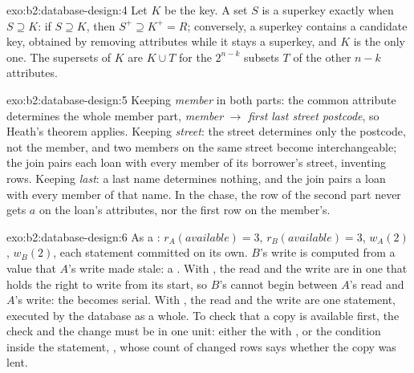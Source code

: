 \begin{solution}{exo:b2:database-design:4}
Let $K$ be the key. A set $S$ is a superkey exactly when $S \supseteq K$: if $S \supseteq K$, then $S^+ \supseteq K^+ = R$;
conversely, a superkey contains a candidate key, obtained by removing attributes while it stays a superkey, and $K$ is the
only one. The supersets of $K$ are $K \cup T$ for the $2^{n-k}$ subsets $T$ of the other $n - k$ attributes.
\end{solution}

\begin{solution}{exo:b2:database-design:5}
Keeping \emph{member} in both parts: the common attribute determines the whole member part, \emph{member} $\to$
\emph{first last street postcode}, so Heath's theorem applies. Keeping \emph{street}: the street determines only the
postcode, not the member, and two members on the same street become interchangeable; the join pairs each loan with
every member of its borrower's street, inventing rows. Keeping \emph{last}: a last name determines nothing, and the join
pairs a loan with every member of that name. In the chase, the row of the second part never gets $a$ on the loan's
attributes, nor the first row on the member's.
\end{solution}

\begin{solution}{exo:b2:database-design:6}
As a : $r_A(\mathit{available}) = 3$, $r_B(\mathit{available}) = 3$, $w_A(2)$, $w_B(2)$, each statement
committed on its own. $B$'s write is computed from a value that $A$'s write made stale: a . With
, the read and the write are in one  that holds the right to write from its start, so
$B$'s  cannot begin between $A$'s read and $A$'s write: the  becomes serial. With
, the read and the write are one statement, executed by the database as a whole. To
check that a copy is available first, the check and the change must be in one unit: either the  with
, or the condition inside the statement, , whose count of changed rows says whether the copy was lent.
\end{solution}


